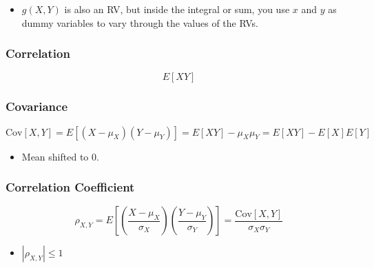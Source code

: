 \begin{notes}
    \begin{itemize}
        \item $g(X,Y)$ is also an RV, but inside the integral or sum, you use $x$ and $y$ as dummy variables to vary through the values of the RVs.
    \end{itemize}
\end{notes}

\subsubsection{Correlation}
\begin{definition}
    \begin{equation}
        E[XY]
    \end{equation}
\end{definition}

\subsubsection{Covariance}
\begin{definition}
    \begin{equation}
        \text{Cov}[X, Y] = E[(X - \mu_X)(Y - \mu_Y)] = E[XY] - \mu_X \mu_Y = E[XY] - E[X]E[Y]
    \end{equation}
\end{definition}

\begin{notes}
    \begin{itemize}
        \item Mean shifted to 0.
    \end{itemize}
\end{notes}

\subsubsection{Correlation Coefficient}
\begin{definition}
    \begin{equation}
        \rho_{X,Y} = E \left[ \left(\frac{X - \mu_X}{\sigma_X} \right) \left( \frac{Y - \mu_Y}{\sigma_Y} \right) \right] = \frac{\text{Cov}[X, Y]}{\sigma_X \sigma_Y}
    \end{equation}
    \begin{itemize}
        \item $|\rho_{X,Y}| \leq 1$
    \end{itemize}
\end{definition}

